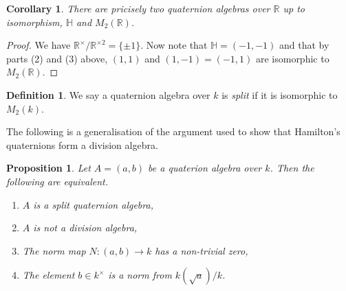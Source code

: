 \documentclass[11pt]{amsart}
\numberwithin{equation}{section}
\newtheorem{cor}[equation]{Corollary}
\newtheorem{proposition}[equation]{Proposition}
\theoremstyle{remark}
\newtheorem{remark}[equation]{Remark}
\theoremstyle{remark}
\theoremstyle{remark}
\theoremstyle{definition}
\theoremstyle{definition}
\theoremstyle{definition}
\newtheorem{defi}[equation]{Definition}
\theoremstyle{definition}
\theoremstyle{definition}
\theoremstyle{definition}
\begin{document}
\begin{cor}
There are pricisely two quaternion algebras over $\mathbb{R}$ up to isomorphism, $\mathbb{H}$ and $M_2(\mathbb{R})$.
\end{cor}

\begin{proof}
We have $\mathbb{R}^{\times}/\mathbb{R}^{\times 2}=\{\pm 1\}$. Now note that $\mathbb{H}=(-1,-1)$ and that by parts (2) and (3) above, $(1,1)$ and $(1,-1)=(-1,1)$ are isomorphic to $M_2(\mathbb{R})$.
\end{proof}

\begin{defi}
We say a quaternion algebra over $k$ is \textit{split} if it is isomorphic to $M_2(k)$. 
\end{defi}


The following is a generalisation of the argument used to show that Hamilton's quaternions form a division algebra.

\begin{proposition} \label{split quaternion}
Let $A=(a,b)$ be a quaterion algebra over $k$. Then the following are equivalent.
\begin{enumerate}
\item $A$ is a split quaternion algebra,
\item $A$ is not a division algebra,
\item The norm map $N:(a,b)\rightarrow k$ has a non-trivial zero,
\item The element $b\in k^{\times}$ is  a norm from $k(\sqrt{a})/k$.
\end{enumerate}
\end{proposition}
\end{document}
